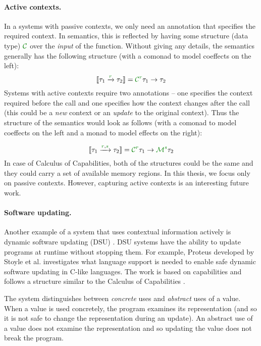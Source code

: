 \paragraph{Active contexts.}
In a systems with passive contexts, we only need an annotation that specifies the required
context. In semantics, this is reflected by having some structure (data type) $\C$ over the
\emph{input} of the function. Without giving any details, the semantics generally has the
following structure (with a comonad to model coeffects on the left):
%
\begin{equation*}
\sem{\tau_1 \xrightarrow{\cclrd{r}} \tau_2} = \C^{\cclrd{r}} \tau_1 \rightarrow \tau_2
\end{equation*}
%
Systems with active contexts require two annotations -- one specifies the context required
before the call and one specifies how the context changes after the call (this
could be a \emph{new} context or an \emph{update} to the original context). Thus the structure
of the semantics would look as follows (with a comonad to model coeffects on the left and a monad to
model effects on the right):

\begin{equation*}
\sem{\tau_1 \xrightarrow{\cclrd{r}, \cclrd{s}} \tau_2} = \C^{\cclrd{r}} \tau_1 \rightarrow \M^{\cclrd{s}} \tau_2
\end{equation*}
%
In case of Calculus of Capabilities, both of the structures could be the same and they could
carry a set of available memory regions. In this thesis, we focus only on passive contexts.
However, capturing active contexts is an interesting future work.


\paragraph{Software updating.}
Another example of a system that uses contextual information actively is dynamic software updating
(DSU) \cite{app-dsu-programs,app-dsu}. DSU systems have the ability to update programs at
runtime without stopping them. For example, Proteus developed by Stoyle et al. \cite{app-dsu-mutatis}
investigates what language support is needed to enable safe dynamic software updating in C-like
languages. The work is based on capabilities and follows a structure similar to the Calculus
of Capabilities \cite{app-capabilities}.

The system distinguishes between \emph{concrete} uses and \emph{abstract} uses of a value. When
a value is used concretely, the program examines its representation (and so it is not safe to
change the representation during an update). An abstract use of a value does not examine
the representation and so updating the value does not break the program.

